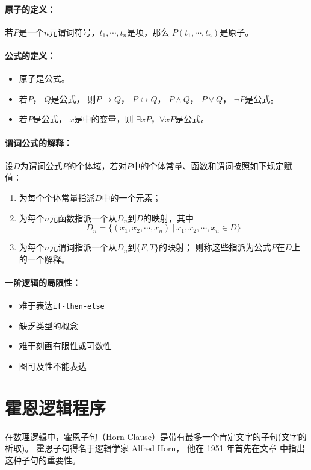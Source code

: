 \paragraph{原子的定义：}
若$P$是一个$n$元谓词符号，$t_1,\cdots,t_n$是项，那么
$P(t_1,\cdots,t_n)$是原子。
\paragraph{公式的定义：}
\begin{itemize}
  \item 原子是公式。
  \item 若$P$， $Q$是公式，
    则$P \rightarrow Q$， $P \leftrightarrow Q$，
    $P \land Q$， $P \lor Q$， $\lnot P$是公式。
  \item 若$P$是公式， $x$是中的变量，则
    $\exists x P$，$\forall x P$是公式。
\end{itemize}

\paragraph{谓词公式的解释：}
设$D$为谓词公式$P$的个体域，若对$P$中的个体常量、函数和谓词按照如下规定赋值：
\begin{enumerate}
  \item 为每个个体常量指派$D$中的一个元素；
  \item 为每个$n$元函数指派一个从$D_n$到$D$的映射，其中
    \begin{equation*}
      D_n = \{ (x_1, x_2, \cdots, x_n) \  | \  x_1, x_2, \cdots, x_n \in D \}
    \end{equation*}
  \item 为每个$n$元谓词指派一个从$D_n$到$ \{F, T\} $的映射；
    则称这些指派为公式$P$在$D$上的一个解释。
\end{enumerate}

\paragraph{一阶逻辑的局限性：}
\begin{itemize}
  \item 难于表达\texttt{if-then-else}
  \item 缺乏类型的概念
  \item 难于刻画有限性或可数性
  \item 图可及性不能表达
\end{itemize}

\section{霍恩逻辑程序}
在数理逻辑中，霍恩子句（Horn Clause）是带有最多一个肯定文字的子句(文字的析取)。
霍恩子句得名于逻辑学家 Alfred Horn，
他在 1951 年首先在文章\cite{DBLP:journals/jsyml/Horn51} 中指出这种子句的重要性。

